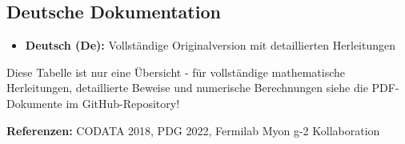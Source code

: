 \documentclass[12pt,a4paper]{article}
\begin{document}
	\subsection{Deutsche Dokumentation}
	
	\begin{itemize}
		\item \textbf{Deutsch (De):} Vollständige Originalversion mit detaillierten Herleitungen
	\end{itemize}
	
	Diese Tabelle ist nur eine Übersicht - für vollständige mathematische Herleitungen, detaillierte Beweise und numerische Berechnungen siehe die PDF-Dokumente im GitHub-Repository!
	
	\textbf{Referenzen:} CODATA 2018, PDG 2022, Fermilab Myon g-2 Kollaboration
	
\end{document}
